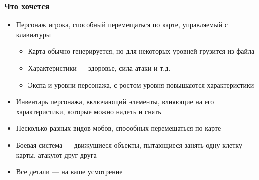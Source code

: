 \documentclass[xetex,mathserif,serif]{beamer}
\begin{document}
    \begin{frame}
        \frametitle{Что хочется}
        \begin{itemize}
            \item Персонаж игрока, способный перемещаться по карте, управляемый с клавиатуры
            \begin{itemize}
                \item Карта обычно генерируется, но для некоторых уровней грузится из файла
                \item Характеристики --- здоровье, сила атаки и т.д.
                \item Экспа и уровни персонажа, с ростом уровня повышаются характеристики
            \end{itemize}
            \item Инвентарь персонажа, включающий элементы, влияющие на его характеристики, которые можно надеть и снять
            \item Несколько разных видов мобов, способных перемещаться по карте
            \item Боевая система --- движущиеся объекты, пытающиеся занять одну клетку карты, атакуют друг друга
            \item Все детали --- на ваше усмотрение
        \end{itemize}
    \end{frame}
\end{document}

